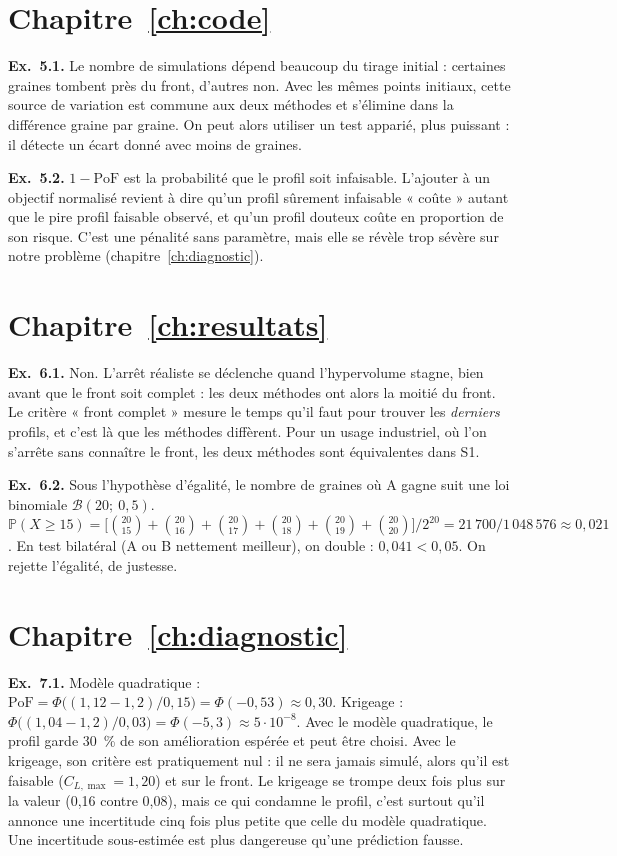 \section*{Chapitre~\ref{ch:code} }
\textbf{Ex.~5.1.} Le nombre de simulations dépend beaucoup du tirage initial : certaines graines tombent près du front, d'autres non. Avec les mêmes points initiaux, cette source de variation est commune aux deux méthodes et s'élimine dans la différence graine par graine. On peut alors utiliser un test apparié, plus puissant : il détecte un écart donné avec moins de graines.

\textbf{Ex.~5.2.} $1-\mathrm{PoF}$ est la probabilité que le profil soit infaisable. L'ajouter à un objectif normalisé revient à dire qu'un profil sûrement infaisable « coûte » autant que le pire profil faisable observé, et qu'un profil douteux coûte en proportion de son risque. C'est une pénalité sans paramètre, mais elle se révèle trop sévère sur notre problème (chapitre~\ref{ch:diagnostic}).

\section*{Chapitre~\ref{ch:resultats} }
\textbf{Ex.~6.1.} Non. L'arrêt réaliste se déclenche quand l'hypervolume stagne, bien avant que le front soit complet : les deux méthodes ont alors la moitié du front. Le critère « front complet » mesure le temps qu'il faut pour trouver les \emph{derniers} profils, et c'est là que les méthodes diffèrent. Pour un usage industriel, où l'on s'arrête sans connaître le front, les deux méthodes sont équivalentes dans S1.

\textbf{Ex.~6.2.} Sous l'hypothèse d'égalité, le nombre de graines où A gagne suit une loi binomiale $\mathcal B(20;\ 0{,}5)$. $\mathbb P(X\ge15)=\big[\binom{20}{15}+\binom{20}{16}+\binom{20}{17}+\binom{20}{18}+\binom{20}{19}+\binom{20}{20}\big]/2^{20}=21\,700/1\,048\,576\approx0{,}021$. En test bilatéral (A ou B nettement meilleur), on double : $0{,}041<0{,}05$. On rejette l'égalité, de justesse.

\section*{Chapitre~\ref{ch:diagnostic} }
\textbf{Ex.~7.1.} Modèle quadratique : $\mathrm{PoF}=\Phi\big((1{,}12-1{,}2)/0{,}15\big)=\Phi(-0{,}53)\approx0{,}30$. Krigeage : $\Phi\big((1{,}04-1{,}2)/0{,}03\big)=\Phi(-5{,}3)\approx5\cdot10^{-8}$. Avec le modèle quadratique, le profil garde 30~\% de son amélioration espérée et peut être choisi. Avec le krigeage, son critère est pratiquement nul : il ne sera jamais simulé, alors qu'il est faisable ($C_{L,\max}=1{,}20$) et sur le front. Le krigeage se trompe deux fois plus sur la valeur (0,16 contre 0,08), mais ce qui condamne le profil, c'est surtout qu'il annonce une incertitude cinq fois plus petite que celle du modèle quadratique. Une incertitude sous-estimée est plus dangereuse qu'une prédiction fausse.

